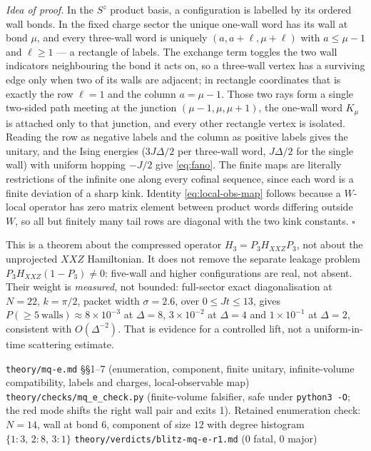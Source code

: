 \noindent\emph{Idea of proof.} In the $S^z$ product basis, a configuration is
labelled by its ordered wall bonds. In the fixed charge sector the unique
one-wall word has its wall at bond $\mu$, and every three-wall word is uniquely
$(a,a+\ell,\mu+\ell)$ with $a\le\mu-1$ and $\ell\ge1$ --- a rectangle of
labels. The exchange term toggles the two wall indicators neighbouring the bond
it acts on, so a three-wall vertex has a surviving edge only when two of its
walls are adjacent; in rectangle coordinates that is exactly the row $\ell=1$
and the column $a=\mu-1$. Those two rays form a single two-sided path meeting at
the junction $(\mu-1,\mu,\mu+1)$, the one-wall word $K_\mu$ is attached only to
that junction, and every other rectangle vertex is isolated. Reading the row as
negative labels and the column as positive labels gives the unitary, and the
Ising energies ($3J\Delta/2$ per three-wall word, $J\Delta/2$ for the single
wall) with uniform hopping $-J/2$ give \eqref{eq:fano}. The finite maps are
literally restrictions of the infinite one along every cofinal sequence, since
each word is a finite deviation of a sharp kink. Identity
\eqref{eq:local-obs-map} follows because a $W$-local operator has zero matrix
element between product words differing outside $W$, so all but finitely many
tail rows are diagonal with the two kink constants. \hfill$\square$

\begin{scope}
\label{scope:Mq-E}
This is a theorem about the compressed operator $H_3=P_3H_{XXZ}P_3$, not about
the unprojected $XXZ$ Hamiltonian. It does not remove the separate leakage
problem $P_3H_{XXZ}(1-P_3)\neq0$: five-wall and higher configurations are real,
not absent. Their weight is \emph{measured}, not bounded: full-sector exact
diagonalisation at $N=22$, $k=\pi/2$, packet width $\sigma=2.6$, over
$0\le Jt\le13$, gives $P(\ge5\ \text{walls})\approx8\times10^{-3}$ at
$\Delta=8$, $3\times10^{-2}$ at $\Delta=4$ and $1\times10^{-1}$ at $\Delta=2$,
consistent with $O(\Delta^{-2})$. That is evidence for a controlled lift, not a
uniform-in-time scattering estimate.
\end{scope}

%
{\texttt{theory/mq-e.md} \S\S1--7 (enumeration, component, finite unitary,
 infinite-volume compatibility, labels and charges, local-observable map)}%
{\texttt{theory/checks/mq\_e\_check.py} (finite-volume falsifier, safe under
 \texttt{python3 -O}; the red mode shifts the right wall pair and exits 1).
 Retained enumeration check: $N=14$, wall at bond $6$, component of size $12$
 with degree histogram $\{1{:}3,\,2{:}8,\,3{:}1\}$}%
{\texttt{theory/verdicts/blitz-mq-e-r1.md} (0 fatal, 0 major)}

